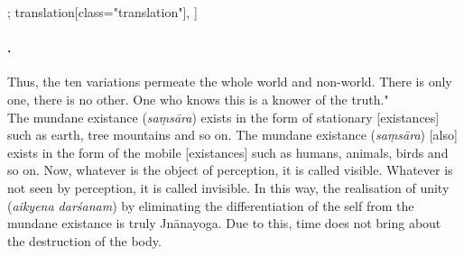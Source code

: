 \begin{alignment}[
  texts=edition[class="edition"];
  translation[class="translation"],
  ]
\begin{translation}
\begin{tlate}
  \paragraph{\textsuperscript{}.} Thus, the ten variations permeate the whole world and non-world. There is only one, there is no other. One who knows this is a knower of the truth."\\

The mundane existance (\textit{saṃsāra}) exists in the form of stationary [existances] such as earth, tree mountains and so on. The mundane existance (\textit{saṃsāra}) [also] exists in the form of the mobile [existances] such as humans, animals, birds and so on.\textsuperscript{\coro{[\lowroman{10}]}} Now, whatever is the object of perception, it is called visible. Whatever is not seen by perception, it is called invisible. In this way, the realisation of unity (\textit{aikyena darśanam}) by eliminating the differentiation of the self from the mundane existance is truly Jnānayoga. Due to this, time does not bring about the destruction of the body.\textsuperscript{\coro{[\lowroman{14}]}}
    \end{tlate}
  \end{translation}
\end{alignment}
